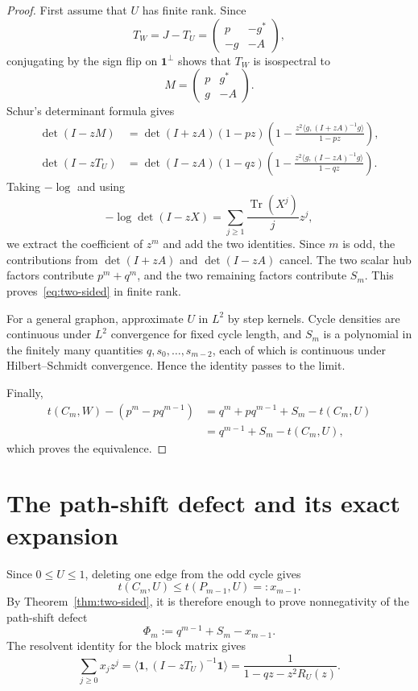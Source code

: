 \documentclass[11pt]{article}
\newcommand{\one}{\mathbf 1}
\newcommand{\ip}[2]{\langle #1,#2\rangle}
\newcommand{\Tr}{\operatorname{Tr}}
\begin{document}
\begin{proof}
First assume that $U$ has finite rank.  Since
\[
        T_W=J-T_U=\begin{pmatrix}p&-g^*\\ -g&-A\end{pmatrix},
\]
conjugating by the sign flip on $\one^\perp$ shows that $T_W$ is isospectral to
\[
        M=\begin{pmatrix}p&g^*\\ g&-A\end{pmatrix}.
\]
Schur's determinant formula gives
\begin{align*}
        \det(I-zM)
        &=\det(I+zA)(1-pz)\left(1-\frac{z^2\ip{g}{(I+zA)^{-1}g}}{1-pz}\right),\\
        \det(I-zT_U)
        &=\det(I-zA)(1-qz)\left(1-\frac{z^2\ip{g}{(I-zA)^{-1}g}}{1-qz}\right).
\end{align*}
Taking $-\log$ and using
\[
        -\log\det(I-zX)=\sum_{j\ge1}\frac{\Tr(X^j)}jz^j,
\]
we extract the coefficient of $z^m$ and add the two identities.  Since $m$ is odd, the contributions from $\det(I+zA)$ and $\det(I-zA)$ cancel.  The two scalar hub factors contribute $p^m+q^m$, and the two remaining factors contribute $S_m$.  This proves~\eqref{eq:two-sided} in finite rank.

For a general graphon, approximate $U$ in $L^2$ by step kernels.  Cycle densities are continuous under $L^2$ convergence for fixed cycle length, and $S_m$ is a polynomial in the finitely many quantities $q,s_0,\ldots,s_{m-2}$, each of which is continuous under Hilbert--Schmidt convergence.  Hence the identity passes to the limit.

Finally,
\[
\begin{aligned}
        t(C_m,W)-(p^m-pq^{m-1})
        &=q^m+pq^{m-1}+S_m-t(C_m,U)\\
        &=q^{m-1}+S_m-t(C_m,U),
\end{aligned}
\]
which proves the equivalence.
\end{proof}

\section{The path-shift defect and its exact expansion}

Since $0\le U\le1$, deleting one edge from the odd cycle gives
\[
        t(C_m,U)\le t(P_{m-1},U)=:x_{m-1}.
\]
By Theorem~\ref{thm:two-sided}, it is therefore enough to prove nonnegativity of the path-shift defect
\begin{equation}\label{eq:Phi-def}
        \Phi_m:=q^{m-1}+S_m-x_{m-1}.
\end{equation}
The resolvent identity for the block matrix gives
\begin{equation}\label{eq:path-resolvent}
        \sum_{j\ge0}x_jz^j
        =\ip{\one}{(I-zT_U)^{-1}\one}
        =\frac1{1-qz-z^2R_U(z)}.
\end{equation}
\end{document}

